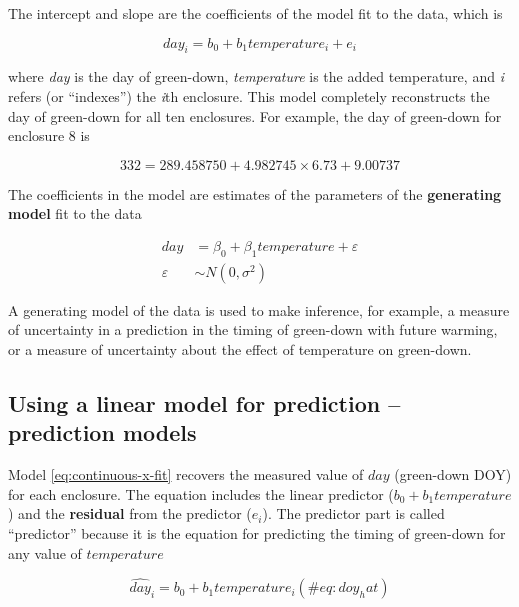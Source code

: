 \documentclass[]{book}
\begin{document}
The intercept and slope are the coefficients of the model fit to the data, which is

\begin{equation}
day_i = b_0 + b_1 temperature_i + e_i
\label{eq:continuous-x-fit}
\end{equation}

where \emph{day} is the day of green-down, \emph{temperature} is the added temperature, and \emph{i} refers (or ``indexes'') the \emph{i}th enclosure. This model completely reconstructs the day of green-down for all ten enclosures. For example, the day of green-down for enclosure 8 is

\begin{equation}
332 = 289.458750 + 4.982745 \times 6.73 + 9.00737
\end{equation}

The coefficients in the model are estimates of the parameters of the \textbf{generating model} fit to the data

\begin{align}
day &= \beta_0 + \beta_1 temperature + \varepsilon\\
\varepsilon &\sim N(0, \sigma^2)
\label{eq:continuous-x-m1}
\end{align}

A generating model of the data is used to make inference, for example, a measure of uncertainty in a prediction in the timing of green-down with future warming, or a measure of uncertainty about the effect of temperature on green-down.

\hypertarget{using-a-linear-model-for-prediction-prediction-models}{%
\subsection{Using a linear model for prediction -- prediction models}\label{using-a-linear-model-for-prediction-prediction-models}}

Model \eqref{eq:continuous-x-fit} recovers the measured value of \(day\) (green-down DOY) for each enclosure. The equation includes the linear predictor (\(b_0 + b_1 temperature\)) and the \textbf{residual} from the predictor (\(e_i\)). The predictor part is called ``predictor'' because it is the equation for predicting the timing of green-down for any value of \(temperature\)

\begin{equation}
\widehat{day}_i = b_0 + b_1 temperature_i
(\#eq:doy_hat)
\end{equation}
\end{document}
